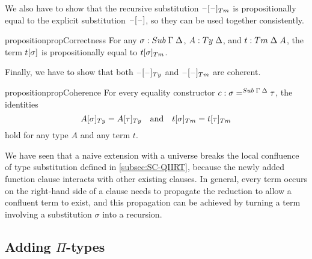 \documentclass[a4paper,UKenglish,numberwithinsect,cleveref,thm-restate]{lipics-v2021}
\newcommand{\danger}{\marginpar[\hfill\dbend]{\dbend\hfill}}
\begin{document}
We also have to show that the recursive substitution $\subTm{\blank}{\blank}$ is propositionally equal to the explicit substitution ${{\mathord{\hspace{1pt}\text{--}\hspace{1pt}}}[ \mathord{\hspace{1pt}\text{--}\hspace{1pt}} ]}$, so they can be used together consistently.


\begin{restatable}{proposition}{propCorrectness}\label{prop:correctness-1}
  For any $\sigma : \Sub\;\Gamma\;\Delta$, $A : \Ty\;\Delta$, and $t : \Tm\;\Delta\;A$, the term ${{t}[ \sigma ]}$ is propositionally equal to $\subTm{t}{\sigma}$.
\end{restatable}

Finally, we have to show that both $\subTy{\blank}{\blank}$ and $\subTm{\blank}{\blank}$ are coherent.
%
\begin{restatable}{proposition}{propCoherence}\label{prop:coherence-2}
  For every equality constructor $\cc : \sigma =^{\Sub\;\Gamma\;\Delta} \tau$, the identities
  \danger
  \[
    \subTy{A}{\sigma} = \subTy{A}{\tau}
    \quad\text{and}\quad
    \subTm{t}{\sigma} = \subTm{t}{\tau}
  \]
  hold for any type $A$ and any term $t$.
\end{restatable}

\begin{remark}
We have seen that a naive extension with a universe breaks the local confluence of type substitution defined in \cref{subsec:SC-QIIRT}, because the newly added function clause interacts with other existing clauses.
In general, every term occurs on the right-hand side of a clause needs to propagate the reduction to allow a confluent term to exist, and this propagation can be achieved by turning a term involving a substitution $\sigma$ into a recursion.
\end{remark}

\subsection{Adding \texorpdfstring{$\Pi$}{Π}-types} \label{subsec:SC+U+Pi}
\end{document}
